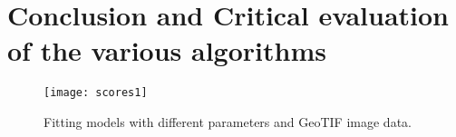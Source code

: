 \section{Conclusion and Critical evaluation of the various algorithms}
\label{chap:Conclusion and Critical evaluation of the various algorithms}

\begin{figure}[H]
\label{fig:scores1}
\texttt{[image: scores1]}
\caption{Fitting models with different parameters and GeoTIF image data.}
\end{figure}
